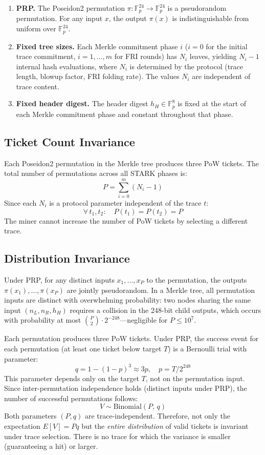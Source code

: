 \documentclass[11pt,a4paper]{article}
\begin{document}
\begin{enumerate}
\item \textbf{PRP.} The Poseidon2 permutation $\pi: \mathbb{F}_p^{24} \to \mathbb{F}_p^{24}$ is a pseudorandom permutation. For any input $x$, the output $\pi(x)$ is indistinguishable from uniform over $\mathbb{F}_p^{24}$.
\item \textbf{Fixed tree sizes.} Each Merkle commitment phase $i$ ($i = 0$ for the initial trace commitment, $i = 1, \ldots, m$ for FRI rounds) has $N_i$ leaves, yielding $N_i - 1$ internal hash evaluations, where $N_i$ is determined by the protocol (trace length, blowup factor, FRI folding rate). The values $N_i$ are independent of trace content.
\item \textbf{Fixed header digest.} The header digest $h_H \in \mathbb{F}_p^8$ is fixed at the start of each Merkle commitment phase and constant throughout that phase.
\end{enumerate}

\subsection{Ticket Count Invariance}

Each Poseidon2 permutation in the Merkle tree produces three PoW tickets. The total number of permutations across all STARK phases is:
\[
  P = \sum_{i=0}^{m} (N_i - 1)
\]
Since each $N_i$ is a protocol parameter independent of the trace $t$:
\[
  \forall\, t_1, t_2: \quad P(t_1) = P(t_2) = P
\]
The miner cannot increase the number of PoW tickets by selecting a different trace.

\subsection{Distribution Invariance}

Under PRP, for any distinct inputs $x_1, \ldots, x_P$ to the permutation, the outputs $\pi(x_1), \ldots, \pi(x_P)$ are jointly pseudorandom. In a Merkle tree, all permutation inputs are distinct with overwhelming probability: two nodes sharing the same input $(n_L, n_R, h_H)$ requires a collision in the 248-bit child outputs, which occurs with probability at most $\binom{P}{2} \cdot 2^{-248}$---negligible for $P \leq 10^7$.

Each permutation produces three PoW tickets. Under PRP, the success event for each permutation (at least one ticket below target $T$) is a Bernoulli trial with parameter:
\[
  q = 1 - (1-p)^3 \approx 3p, \quad p = T / 2^{248}
\]
This parameter depends only on the target $T$, not on the permutation input. Since inter-permutation independence holds (distinct inputs under PRP), the number of successful permutations follows:
\[
  V \sim \mathrm{Binomial}(P,\, q)
\]
Both parameters $(P, q)$ are trace-independent. Therefore, not only the expectation $E[V] = Pq$ but the \emph{entire distribution} of valid tickets is invariant under trace selection. There is no trace for which the variance is smaller (guaranteeing a hit) or larger.
\end{document}
